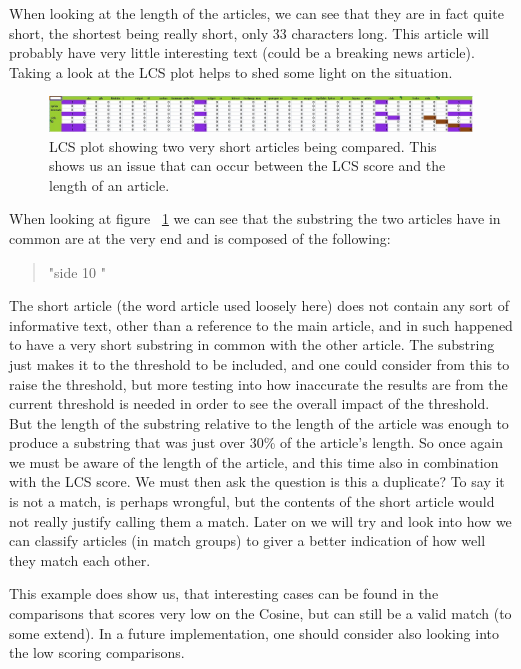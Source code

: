 When looking at the length of the articles, we can see that they are in fact quite short, the shortest being really short, only 33 characters long. This article will probably have very little interesting text (could be a breaking news article). Taking a look at the LCS plot helps to shed some light on the situation.

\begin{figure}
	\centering
	\includegraphics[scale=0.38]{figures/LengthIssue}
	\caption{LCS plot showing two very short articles being compared. This shows us an issue that can occur between the LCS score and the length of an article.}
	\label{LengthIssue}
\end{figure}

When looking at figure ~\ref{LengthIssue} we can see that the substring the two articles have in common are at the very end and is composed of the following: 
\begin{quote}
"side 10 \textvisiblespace \textvisiblespace"
\end{quote}

The short article (the word article used loosely here) does not contain any sort of informative text, other than a reference to the main article, and in such happened to have a very short substring in common with the other article. The substring just makes it to the threshold to be included, and one could consider from this to raise the threshold, but more testing into how inaccurate the results are from the current threshold is needed in order to see the overall impact of the threshold. But the length of the substring relative to the length of the article was enough to produce a substring that was just over 30\% of the article's length. So once again we must be aware of the length of the article, and this time also in combination with the LCS score. We must then ask the question is this a duplicate? To say it is not a match, is perhaps wrongful, but the contents of the short article would not really justify calling them a match. Later on we will try and look into how we can classify articles (in match groups) to giver a better indication of how well they match each other.

This example does show us, that interesting cases can be found in the comparisons that scores very low on the Cosine, but can still be a valid match (to some extend). In a future implementation, one should consider also looking into the low scoring comparisons.

